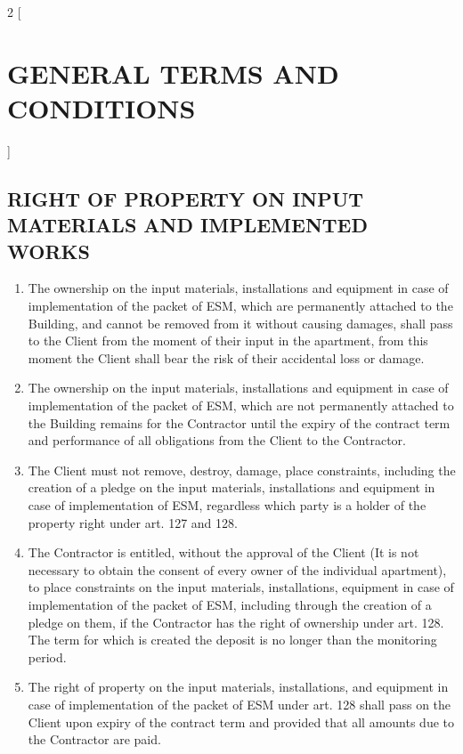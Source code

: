 \begin{multicols}{2} [\section{GENERAL TERMS AND CONDITIONS}]
      \subsection{RIGHT OF PROPERTY ON INPUT MATERIALS AND IMPLEMENTED
        WORKS}
      \begin{enumerate}
      \item The ownership on the input materials, installations and
        equipment in case of implementation of the packet of ESM,
        which are permanently attached to the Building, and cannot be
        removed from it without causing damages, shall pass to the
        Client from the moment of their input in the apartment, from
        this moment the Client shall bear the risk of their accidental
        loss or damage.
      \item The ownership on the input materials, installations and
        equipment in case of implementation of the packet of ESM,
        which are not permanently attached to the Building remains for
        the Contractor until the expiry of the contract term and
        performance of all obligations from the Client to the
        Contractor.
      \item The Client must not remove, destroy, damage, place
        constraints, including the creation of a pledge on the input
        materials, installations and equipment in case of
        implementation of ESM, regardless which party is a holder of
        the property right under art. 127 and 128.
      \item The Contractor is entitled, without the approval of the
        Client (It is not necessary to obtain the consent of every
        owner of the individual apartment), to place constraints on
        the input materials, installations, equipment in case of
        implementation of the packet of ESM, including through the
        creation of a pledge on them, if the Contractor has the right
        of ownership under art. 128. The term for which is created the
        deposit is no longer than the monitoring period.
      \item The right of property on the input materials,
        installations, and equipment in case of implementation of the
        packet of ESM under art. 128 shall pass on the Client upon
        expiry of the contract term and provided that all amounts due
        to the Contractor are paid.
      \end{enumerate}


\end{multicols}
